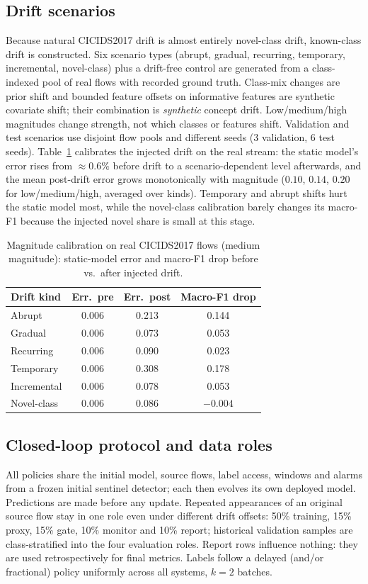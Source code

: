 \documentclass[conference]{IEEEtran}
\begin{document}
\subsection{Drift scenarios}
Because natural CICIDS2017 drift is almost entirely novel-class drift, known-class drift is constructed. Six scenario types (abrupt, gradual, recurring, temporary, incremental, novel-class) plus a drift-free control are generated from a class-indexed pool of real flows with recorded ground truth. Class-mix changes are prior shift and bounded feature offsets on informative features are synthetic covariate shift; their combination is \emph{synthetic} concept drift. Low/medium/high magnitudes change strength, not which classes or features shift. Validation and test scenarios use disjoint flow pools and different seeds (3 validation, 6 test seeds). Table~\ref{tab:calib} calibrates the injected drift on the real stream: the static model's error rises from $\approx\!0.6\%$ before drift to a scenario-dependent level afterwards, and the mean post-drift error grows monotonically with magnitude ($0.10$, $0.14$, $0.20$ for low/medium/high, averaged over kinds). Temporary and abrupt shifts hurt the static model most, while the novel-class calibration barely changes its macro-F1 because the injected novel share is small at this stage.
\begin{table}[t]
\centering\caption{Magnitude calibration on real CICIDS2017 flows (medium magnitude): static-model error and macro-F1 drop before vs.\ after injected drift.}\label{tab:calib}
\footnotesize
\begin{tabular}{lccc}
\toprule
Drift kind & Err.\ pre & Err.\ post & Macro-F1 drop \\
\midrule
Abrupt      & 0.006 & 0.213 & 0.144 \\
Gradual     & 0.006 & 0.073 & 0.053 \\
Recurring   & 0.006 & 0.090 & 0.023 \\
Temporary   & 0.006 & 0.308 & 0.178 \\
Incremental & 0.006 & 0.078 & 0.053 \\
Novel-class & 0.006 & 0.086 & $-0.004$ \\
\bottomrule
\end{tabular}
\end{table}

\subsection{Closed-loop protocol and data roles}
All policies share the initial model, source flows, label access, windows and alarms from a frozen initial sentinel detector; each then evolves its own deployed model. Predictions are made before any update. Repeated appearances of an original source flow stay in one role even under different drift offsets: 50\% training, 15\% proxy, 15\% gate, 10\% monitor and 10\% report; historical validation samples are class-stratified into the four evaluation roles. Report rows influence nothing: they are used retrospectively for final metrics. Labels follow a delayed (and/or fractional) policy uniformly across all systems, $k=2$ batches.
\end{document}
